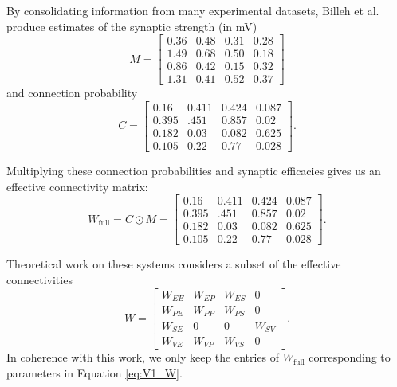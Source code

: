 \documentclass[11pt]{article}
\begin{document}
By consolidating information from many experimental datasets, Billeh et al. \cite{billeh2019systematic} produce estimates of the synaptic strength (in mV)
\begin{equation}
M = \begin{bmatrix} 0.36 & 0.48 & 0.31 & 0.28 \\
1.49 & 0.68 & 0.50 & 0.18 \\
0.86 & 0.42 & 0.15 & 0.32 \\
1.31 & 0.41 & 0.52 & 0.37 \end{bmatrix}
\end{equation}
and connection probability
\begin{equation}
C = \begin{bmatrix} 0.16 & 0.411 & 0.424 &  0.087 \\
0.395 & .451 & 0.857 & 0.02 \\
0.182 & 0.03 & 0.082 & 0.625 \\
0.105 & 0.22 & 0.77 & 0.028 \end{bmatrix}.
\end{equation}

Multiplying these connection probabilities and synaptic efficacies gives us an effective connectivity matrix:
\begin{equation}
W_{\text{full}} = C \odot M = \begin{bmatrix} 0.16 & 0.411 & 0.424 &  0.087 \\
0.395 & .451 & 0.857 & 0.02 \\
0.182 & 0.03 & 0.082 & 0.625 \\
0.105 & 0.22 & 0.77 & 0.028 \end{bmatrix}.
\end{equation}

Theoretical work on these systems considers a subset of the effective connectivities \cite{litwin2016inhibitory, GarciaDelMolino2017, Chen2019}
\begin{equation} \label{eq:V1_W}
W = \begin{bmatrix} W_{EE} & W_{EP} & W_{ES} & 0 \\
                                W_{PE} & W_{PP} & W_{PS} & 0 \\
                                W_{SE} & 0 & 0 & W_{SV} \\
                                W_{VE} & W_{VP} &  W_{VS} &  0 \end{bmatrix}.
\end{equation}
In coherence with this work, we only keep the entries of $W_{\text{full}}$ corresponding to parameters in Equation \ref{eq:V1_W}.
\end{document}
